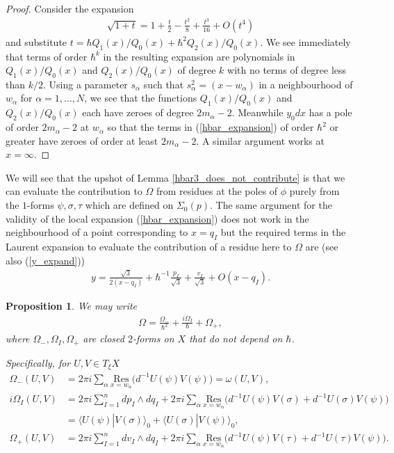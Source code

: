 \documentclass[a4paper,12pt,reqno]{amsart}
\newcounter{counter2}
\numberwithin{equation}{section}
\numberwithin{counter2}{section}
\newcounter{counter3}
\newtheorem{prop}[counter2]{Proposition}
\begin{document}
\begin{proof}
Consider the expansion
\begin{align}
\sqrt{1+t} = 1+\frac{t}{2}-\frac{t^2}{8}+\frac{t^3}{16} + O(t^4)
\end{align}
and substitute $t = \hbar{Q_1(x)}/{Q_0(x)} + \hbar^2{Q_2(x)}/{Q_0(x)}$. 
We see immediately that terms of order $\hbar^k$ in the resulting expansion are polynomials in ${Q_1(x)}/{Q_0(x)}$ and ${Q_2(x)}/{Q_0(x)}$ of degree $k$ with no terms of degree less than $k/2$.  Using a parameter $s_\alpha$ such that $s_\alpha^2 = (x-w_\alpha)$ in a neighbourhood of $w_\alpha$ for $\alpha = 1,...,N$, we see that the functions $Q_1(x)/Q_0(x)$ and ${Q_2(x)}/{Q_0(x)}$ each have zeroes of degree $2m_\alpha - 2$.  Meanwhile $y_0 dx$ has a pole of order $2m_\alpha-2$ at $w_\alpha$ so that the terms in (\ref{hbar_expansion}) of order $\hbar^2$ or greater have zeroes of order at least $2m_\alpha-2$.  A similar argument works at $x = \infty$.  
\end{proof}
We will see that the upshot of Lemma \ref{hbar3_does_not_contribute} is that we can evaluate the contribution to $\Omega$ from residues at the poles of $\phi$ purely from the $1$-forms $\psi,\sigma,\tau$ which are defined on $\Sigma_0(p)$.  The same argument for the validity of the local expansion (\ref{hbar_expansion}) does not work in the neighbourhood of a point corresponding to $x = q_I$ but the required terms in the Laurent expansion to evaluate the contribution of a residue here to $\Omega$ are (see also (\ref{y_expand}))
\begin{align}\label{q_I contribution to Omega}
y = \frac{\sqrt{3}}{2(x-q_I)} +  \hbar^{-1}\frac{p_I}{\sqrt{3}}+ \frac{v_I}{\sqrt{3}} + O(x-q_I).  
\end{align}
\begin{prop}\label{Omega_is_O(2)_valued}
We may write 
\begin{align}
\Omega = \frac{\Omega_{-}}{\hbar^2} + \frac{i\Omega_{I}}{\hbar} + \Omega_{+},  
\end{align}
where $\Omega_{-},\Omega_{I},\Omega_{+}$ are closed $2$-forms on $X$ that do not depend on $\hbar$.  \par Specifically,  for $U,V \in T_\xi X$ 
\begin{align}
\Omega_{-}(U,V) &= 2\pi i \sum_{\alpha} \underset{x=w_\alpha}{\mathrm{Res}} \big( d^{-1} U(\psi) V(\psi) \big) = \omega(U,V), \label{Omega0_formula} \\
i\Omega_{I}(U,V) &= 2\pi i \sum_{I=1}^n dp_I \wedge dq_I  + 2\pi i \sum_{\alpha} \underset{x=w_\alpha}{\mathrm{Res}} \big( d^{-1} U(\psi)  V(\sigma) + d^{-1} U(\sigma) V(\psi)  \big) \label{OmegaI_formula} \\
&= {\langle U(\psi) | V(\sigma) \rangle_0 + \langle U(\sigma) | V(\psi) \rangle_0  } ,\label{OmegaI_intersection_formula}\\ 
\Omega_{+}(U,V) &= 2\pi i \sum_{I=1}^n dv_I \wedge dq_I + 2\pi  i\sum_{\alpha} \underset{x=w_\alpha}{\mathrm{Res}} \big( d^{-1} U(\psi) V(\tau) +  d^{-1} U(\tau) V(\psi)  \big).  \label{Omegainf_formula}
\end{align}
\end{prop}
\end{document}
